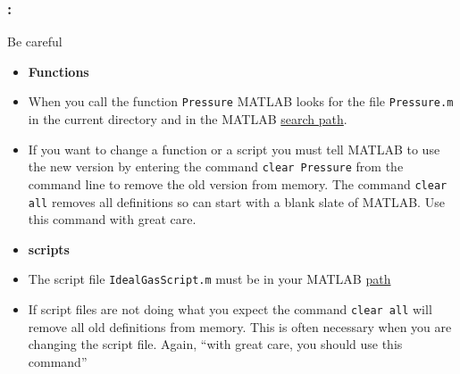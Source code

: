 \documentclass[11pt]{beamer}
\begin{document}
\begin{frame}[fragile]
	
	\frametitle{\secname : \subsecname}
	\vspace{-5pt}
	\begin{alertblock}{Be careful}
		\begin{itemize}
			\item[] \textbf{Functions}
			\item When you call the function \verb|Pressure| MATLAB looks for the file \verb|Pressure.m| 
			in the current directory and in the MATLAB \href{http://www.mathworks.com/help/matlab/matlab_env/add-remove-or-reorder-folders-on-the-search-path.html}{search path}. 
			\item If you want to change a function or a script you must tell MATLAB to
			use the new version by entering the command \verb|clear Pressure| from the
			command line to remove the old version from memory. The command \verb|clear all| 
			removes all definitions so can start with a blank slate of MATLAB. Use this command
			with great care. 
			\item[] \textbf{scripts}
			\item The script file \verb|IdealGasScript.m| must be in your MATLAB \href{http://www.mathworks.com/help/matlab/matlab_env/add-remove-or-reorder-folders-on-the-search-path.html}{path}
			\item If script files are not doing what you expect the command \verb|clear all| will remove all old
			definitions from memory. This is often necessary when you are changing the script file. Again, ``with great care, you should use this command''
		\end{itemize}
	\end{alertblock}
	\vspace{-15pt}
	\begin{minipage}[t]{0.47\linewidth}

	\end{minipage}
	\hspace{10pt}
	\begin{minipage}[t]{0.47\linewidth}
		
	\end{minipage}
	
\end{frame}
\end{document}
